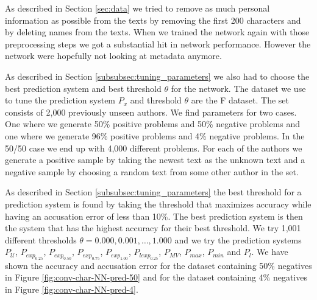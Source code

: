 As described in Section \ref{sec:data} we tried to remove as much personal
information as possible from the texts by removing the first 200 characters and
by deleting names from the texts. When we trained the network again with those
preprocessing steps we got a substantial hit in network performance. However the
network were hopefully not looking at metadata anymore.

As described in Section \ref{subsubsec:tuning_parameters} we also had to choose
the best prediction system and best threshold $\theta$ for the network. The
dataset we use to tune the prediction system $P_x$ and threshold $\theta$ are
the \gls{F} dataset. The set consists of 2,000 previously unseen authors. We
find parameters for two cases. One where we generate 50\% positive problems and
50\% negative problems and one where we generate 96\% positive problems and 4\%
negative problems. In the 50/50 case we end up with 4,000 different problems.
For each of the authors we generate a positive sample by taking the newest text
as the unknown text and a negative sample by choosing a random text from some
other author in the set.

As described in Section \ref{subsubsec:tuning_parameters} the best threshold
for a prediction system is found by taking the threshold that maximizes
accuracy while having an accusation error of less than 10\%. The best
prediction system is then the system that has the highest accuracy for
their best threshold. We try 1,001 different thresholds $\theta = 0.000,
0.001, \dots, 1.000$ and we try the prediction systems $P_\mathcal{U}$,
$P_{exp_{0.25}}$, $P_{exp_{0.50}}$, $P_{exp_{0.75}}$, $P_{exp_{1.00}}$,
$P_{lexp_{0.25}}$, $P_{MV}$, $P_{max}$, $P_{min}$ and $P_l$. We have shown
the accuracy and accusation error for the dataset containing 50\% negatives
in Figure \ref{fig:conv-char-NN-pred-50} and for the dataset containing 4\%
negatives in Figure \ref{fig:conv-char-NN-pred-4}.

